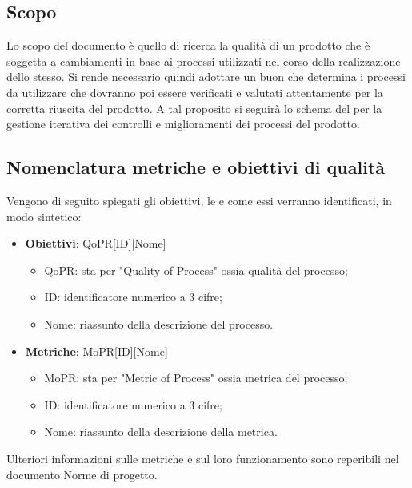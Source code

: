 \documentclass[../paino-di-qualifica.tex]{subfiles}
\begin{document}
\subsection{Scopo}%
\label{sub:scopo}
Lo scopo del documento è quello di ricerca la qualità di un prodotto che è soggetta a cambiamenti in base ai processi utilizzati nel corso della realizzazione dello stesso.
Si rende necessario quindi adottare un buon  che determina i processi da utilizzare che dovranno poi essere verificati e valutati attentamente per la corretta riuscita del prodotto.
A tal proposito si seguirà lo schema del  per la gestione iterativa dei controlli e miglioramenti dei processi del prodotto.

\subsection{Nomenclatura metriche e obiettivi di qualità}%
\label{sub:nomenclatura_metriche_e_obiettivi_di_qualita}
Vengono di seguito spiegati gli obiettivi, le  e come essi verranno identificati, in modo sintetico:
\begin{itemize}
    \item \textbf{Obiettivi}: QoPR[ID][Nome]
        \begin{itemize}
            \item QoPR: sta per "Quality of Process" ossia qualità del processo;
            \item ID: identificatore numerico a 3 cifre;
            \item Nome: riassunto della descrizione del processo.
        \end{itemize}
    \item \textbf{Metriche}: MoPR[ID][Nome]
        \begin{itemize}
            \item MoPR: sta per "Metric of Process" ossia metrica del processo;
            \item ID: identificatore numerico a 3 cifre;
            \item Nome: riassunto della descrizione della metrica.
        \end{itemize}
\end{itemize}  
Ulteriori informazioni sulle metriche e sul loro funzionamento sono reperibili nel documento Norme di progetto.
\end{document}
